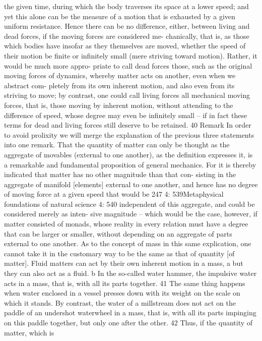 the given time, during which the body traverses its space at a lower speed;
and yet this alone can be the measure of a motion that is exhausted by
a given uniform resistance. Hence there can be no difference, either,
between living and dead forces, if the moving forces are considered me-
chanically, that is, as those which bodies have insofar as they themselves
are moved, whether the speed of their motion be ﬁnite or inﬁnitely small
(mere striving toward motion). Rather, it would be much more appro-
priate to call dead forces those, such as the original moving forces of
dynamics, whereby matter acts on another, even when we abstract com-
pletely from its own inherent motion, and also even from its striving to
move; by contrast, one could call living forces all mechanical moving
forces, that is, those moving by inherent motion, without attending to
the difference of speed, whose degree may even be inﬁnitely small – if in
fact these terms for dead and living forces still deserve to be retained. 40
Remark
In order to avoid prolixity we will merge the explanation of the previous
three statements into one remark.
That the quantity of matter can only be thought as the aggregate of
movables (external to one another), as the deﬁnition expresses it, is a
remarkable and fundamental proposition of general mechanics. For it
is thereby indicated that matter has no other magnitude than that con-
sisting in the aggregate of manifold [elements] external to one another,
and hence has no degree of moving force at a given speed that would be
247
4: 539Metaphysical foundations of natural science
4: 540
independent of this aggregate, and could be considered merely as inten-
sive magnitude – which would be the case, however, if matter consisted
of monads, whose reality in every relation must have a degree that can be
larger or smaller, without depending on an aggregate of parts external
to one another. As to the concept of mass in this same explication, one
cannot take it in the customary way to be the same as that of quantity
[of matter]. Fluid matters can act by their own inherent motion in a
mass, a but they can also act as a ﬂuid. b In the so-called water hammer,
the impulsive water acts in a mass, that is, with all its parts together. 41
The same thing happens when water enclosed in a vessel presses down
with its weight on the scale on which it stands. By contrast, the water
of a millstream does not act on the paddle of an undershot waterwheel
in a mass, that is, with all its parts impinging on this paddle together,
but only one after the other. 42 Thus, if the quantity of matter, which is
